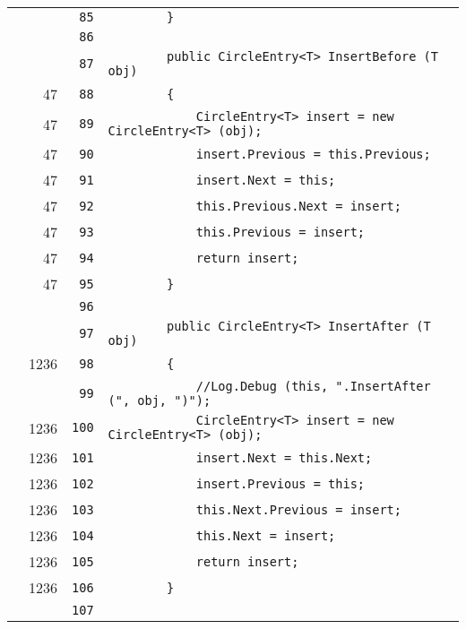 \documentclass[a4paper,10pt]{article}
\begin{document}
\begin{longtable}[l]{lrrl}
\cellcolor{gray} &  & \verb~85~ & \verb~        }~\\
\cellcolor{gray} &  & \verb~86~ & \verb~~\\
\cellcolor{gray} &  & \verb~87~ & \verb~        public CircleEntry<T> InsertBefore (T obj)~\\
\cellcolor{green} & 47 & \verb~88~ & \verb~        {~\\
\cellcolor{green} & 47 & \verb~89~ & \verb~            CircleEntry<T> insert = new CircleEntry<T> (obj);~\\
\cellcolor{green} & 47 & \verb~90~ & \verb~            insert.Previous = this.Previous;~\\
\cellcolor{green} & 47 & \verb~91~ & \verb~            insert.Next = this;~\\
\cellcolor{green} & 47 & \verb~92~ & \verb~            this.Previous.Next = insert;~\\
\cellcolor{green} & 47 & \verb~93~ & \verb~            this.Previous = insert;~\\
\cellcolor{green} & 47 & \verb~94~ & \verb~            return insert;~\\
\cellcolor{green} & 47 & \verb~95~ & \verb~        }~\\
\cellcolor{gray} &  & \verb~96~ & \verb~~\\
\cellcolor{gray} &  & \verb~97~ & \verb~        public CircleEntry<T> InsertAfter (T obj)~\\
\cellcolor{green} & 1236 & \verb~98~ & \verb~        {~\\
\cellcolor{gray} &  & \verb~99~ & \verb~            //Log.Debug (this, ".InsertAfter (", obj, ")");~\\
\cellcolor{green} & 1236 & \verb~100~ & \verb~            CircleEntry<T> insert = new CircleEntry<T> (obj);~\\
\cellcolor{green} & 1236 & \verb~101~ & \verb~            insert.Next = this.Next;~\\
\cellcolor{green} & 1236 & \verb~102~ & \verb~            insert.Previous = this;~\\
\cellcolor{green} & 1236 & \verb~103~ & \verb~            this.Next.Previous = insert;~\\
\cellcolor{green} & 1236 & \verb~104~ & \verb~            this.Next = insert;~\\
\cellcolor{green} & 1236 & \verb~105~ & \verb~            return insert;~\\
\cellcolor{green} & 1236 & \verb~106~ & \verb~        }~\\
\cellcolor{gray} &  & \verb~107~ & \verb~~\\

\end{longtable}
\end{document}

